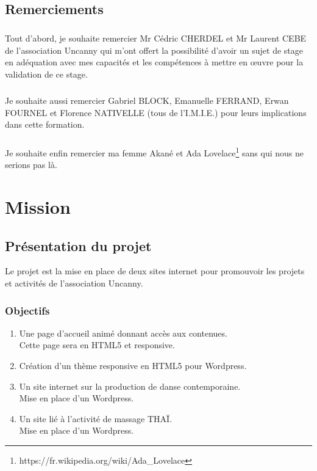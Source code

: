 \documentclass[11pt,a4paper]{report}
\begin{document}
	\section{Remerciements}
		\paragraph*{}Tout d'abord, je souhaite  remercier Mr Cédric CHERDEL et Mr Laurent CEBE de l'association Uncanny qui m'ont offert la possibilité d'avoir un sujet de stage en adéquation avec mes capacités et les compétences à mettre en œuvre pour la validation de ce stage.
		\paragraph*{}Je souhaite aussi remercier Gabriel BLOCK, Emanuelle FERRAND, Erwan FOURNEL et Florence \linebreak NATIVELLE (tous de l'I.M.I.E.) pour leurs implications dans cette formation.
		\paragraph*{}Je souhaite enfin remercier ma femme Akané et Ada Lovelace\footnote{https://fr.wikipedia.org/wiki/Ada\_Lovelace} sans qui nous ne serions pas là.

\chapter{Mission}
	\section{Présentation du projet}
		Le projet est la mise en place de deux sites internet pour promouvoir les projets et activités de l'association Uncanny. 
		\subsection{Objectifs}
			\begin{enumerate}
				\item Une page d'accueil animé donnant accès aux contenues.\\
				Cette page sera en HTML5 et responsive.
				\item Création d'un thème responsive en HTML5 pour Wordpress.
				\item Un site internet sur la production de danse contemporaine.\\
				Mise en place d'un Wordpress.
				\item Un site lié à l'activité de massage THAÏ.\\
				Mise en place d'un Wordpress.
			\end{enumerate}
\end{document}
